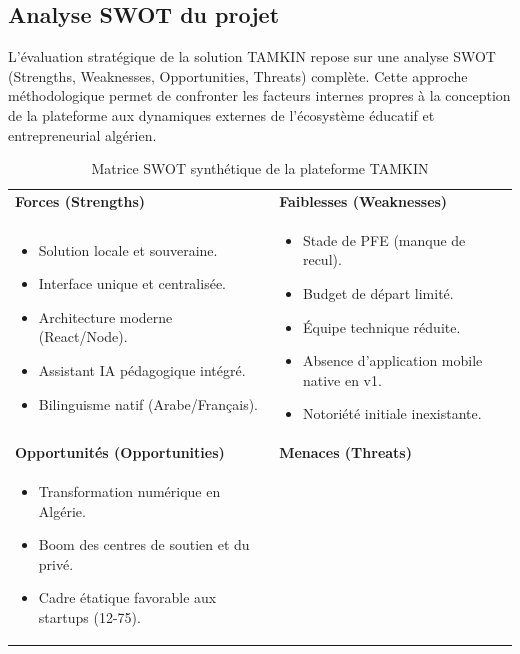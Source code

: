 \documentclass[12pt,a4paper,oneside]{report}
\begin{document}
\subsection{Analyse SWOT du projet}
L'évaluation stratégique de la solution TAMKIN repose sur une analyse SWOT (Strengths, Weaknesses, Opportunities, Threats) complète. Cette approche méthodologique permet de confronter les facteurs internes propres à la conception de la plateforme aux dynamiques externes de l'écosystème éducatif et entrepreneurial algérien.

\begin{table}[htbp]
\centering
\caption{Matrice SWOT synthétique de la plateforme TAMKIN}
\label{tab:matrice_swot}
\begin{tabularx}{\textwidth}{|X|X|}
\hline
\cellcolor{gray!15}\textbf{Forces (Strengths)} & \cellcolor{gray!15}\textbf{Faiblesses (Weaknesses)} \\
\small
\begin{itemize}
    \item Solution locale et souveraine.
    \item Interface unique et centralisée.
    \item Architecture moderne (React/Node).
    \item Assistant IA pédagogique intégré.
    \item Bilinguisme natif (Arabe/Français).
\end{itemize}
& 
\small
\begin{itemize}
    \item Stade de PFE (manque de recul).
    \item Budget de départ limité.
    \item Équipe technique réduite.
    \item Absence d'application mobile native en v1.
    \item Notoriété initiale inexistante.
\end{itemize} \\
\hline
\cellcolor{gray!15}\textbf{Opportunités (Opportunities)} & \cellcolor{gray!15}\textbf{Menaces (Threats)} \\
\small
\begin{itemize}
    \item Transformation numérique en Algérie.
    \item Boom des centres de soutien et du privé.
    \item Cadre étatique favorable aux startups (12-75).

\end{itemize}
\end{tabularx}
\end{table}
\end{document}

